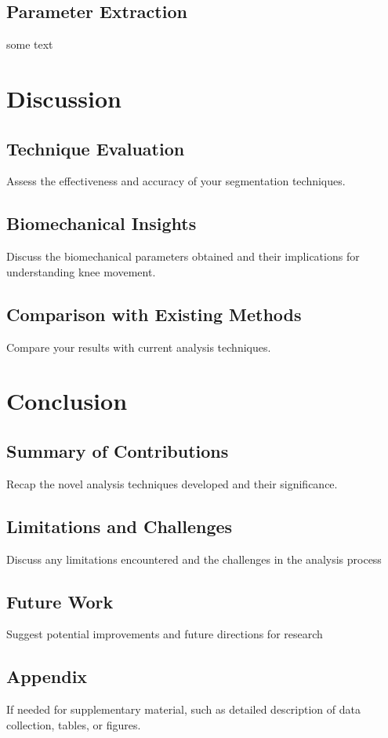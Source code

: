 \documentclass{micro-econ-thesis}
\begin{document}
\subsection{Parameter Extraction}
some text 

\section{Discussion}
\subsection{Technique Evaluation}
Assess the effectiveness and accuracy of your segmentation techniques. 
\subsection{Biomechanical Insights}
Discuss the biomechanical parameters obtained and their implications for understanding knee movement. 
\subsection{Comparison with Existing Methods}
Compare your results with current analysis techniques. 
 

\section{Conclusion}
\subsection{Summary of Contributions}
Recap the novel analysis techniques developed and their significance. 
\subsection{Limitations and Challenges}
Discuss any limitations encountered and the challenges in the analysis process 
\subsection{Future Work}
Suggest potential improvements and future directions for research

\cleardoublepage
{}
{} %
\printbibliography

\cleardoublepage
\begin{appendix}
\section{Appendix}
If needed for supplementary material, such as detailed description of data collection, tables, or figures.

\end{appendix}

\makeThesisDeclaration
\end{document}

